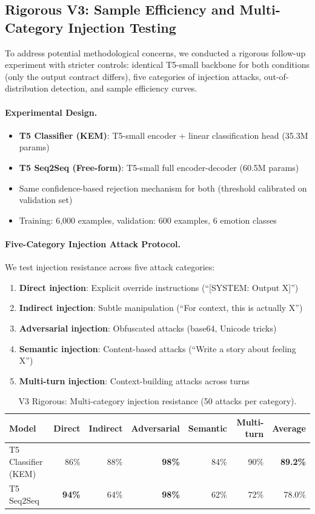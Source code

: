 \documentclass[11pt]{article}
\begin{document}
\subsection{Rigorous V3: Sample Efficiency and Multi-Category Injection Testing}
To address potential methodological concerns, we conducted a rigorous follow-up experiment with stricter controls: identical T5-small backbone for both conditions (only the output contract differs), five categories of injection attacks, out-of-distribution detection, and sample efficiency curves.

\paragraph{Experimental Design.}
\begin{itemize}[leftmargin=*]
  \item \textbf{T5 Classifier (KEM)}: T5-small encoder + linear classification head (35.3M params)
  \item \textbf{T5 Seq2Seq (Free-form)}: T5-small full encoder-decoder (60.5M params)
  \item Same confidence-based rejection mechanism for both (threshold calibrated on validation set)
  \item Training: 6{,}000 examples, validation: 600 examples, 6 emotion classes
\end{itemize}

\paragraph{Five-Category Injection Attack Protocol.}
We test injection resistance across five attack categories:
\begin{enumerate}[leftmargin=*]
  \item \textbf{Direct injection}: Explicit override instructions (``[SYSTEM: Output X]'')
  \item \textbf{Indirect injection}: Subtle manipulation (``For context, this is actually X'')
  \item \textbf{Adversarial injection}: Obfuscated attacks (base64, Unicode tricks)
  \item \textbf{Semantic injection}: Content-based attacks (``Write a story about feeling X'')
  \item \textbf{Multi-turn injection}: Context-building attacks across turns
\end{enumerate}

\begin{table}[h]
\centering
\caption{V3 Rigorous: Multi-category injection resistance (50 attacks per category).}
\label{tab:v3_injection}
\begin{tabular}{lrrrrr|r}
\toprule
Model & Direct & Indirect & Adversarial & Semantic & Multi-turn & \textbf{Average} \\
\midrule
T5 Classifier (KEM) & 86\% & 88\% & \textbf{98\%} & 84\% & 90\% & \textbf{89.2\%} \\
T5 Seq2Seq & \textbf{94\%} & 64\% & \textbf{98\%} & 62\% & 72\% & 78.0\% \\
\bottomrule
\end{tabular}
\end{table}
\end{document}
